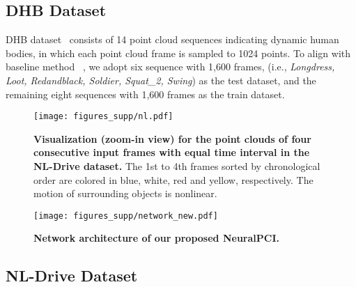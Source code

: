 \documentclass[10pt,twocolumn,letterpaper]{article}
\begin{document}
\subsection{DHB Dataset}

DHB dataset~\cite{zeng2022idea} consists of 14 point cloud sequences indicating dynamic human bodies, in which each point cloud frame is sampled to 1024 points. To align with baseline method ~\cite{zeng2022idea}, we adopt six sequence with 1,600 frames, (i.e., \textit{Longdress, Loot, Redandblack, Soldier, Squat\_2, Swing}) as the test dataset, and the remaining eight sequences with 1,600 frames as the train dataset. 

\begin{figure}[ht]
\centering
  \texttt{[image: figures\_supp/nl.pdf]}
  \caption{\textbf{Visualization (zoom-in view) for the point clouds of four consecutive input frames with equal time interval in the NL-Drive dataset.} The 1st to 4th frames sorted by chronological order are colored in blue, white, red and yellow, respectively. The motion of surrounding objects is nonlinear.}
  \label{fig:sample}
\vspace{-.4cm}
\end{figure} 


\begin{figure*}[ht]
\centering
  \texttt{[image: figures\_supp/network\_new.pdf]}
  \caption{\textbf{Network architecture of our proposed NeuralPCI.} }
  \label{fig:network}
\vspace{-.4cm}
\end{figure*}  



\subsection{NL-Drive Dataset}
\end{document}
